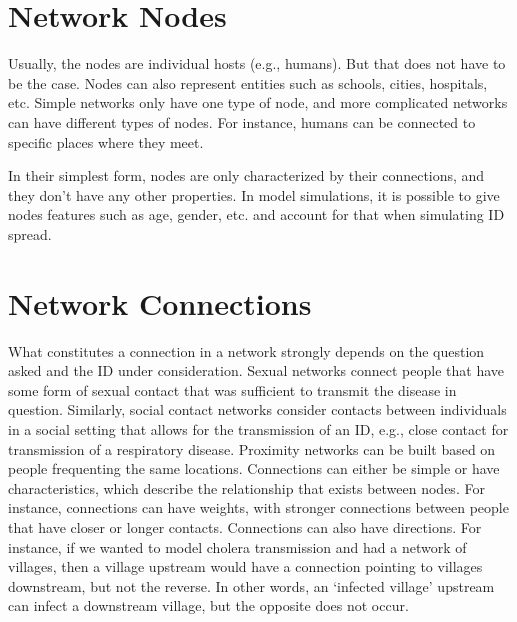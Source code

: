 \documentclass[]{book}
\theoremstyle{definition}
\theoremstyle{definition}
\theoremstyle{definition}
\theoremstyle{remark}
\begin{document}
\section{Network Nodes}\label{network-nodes}

Usually, the nodes are individual hosts (e.g., humans). But that does
not have to be the case. Nodes can also represent entities such as
schools, cities, hospitals, etc. Simple networks only have one type of
node, and more complicated networks can have different types of nodes.
For instance, humans can be connected to specific places where they
meet.

In their simplest form, nodes are only characterized by their
connections, and they don't have any other properties. In model
simulations, it is possible to give nodes features such as age, gender,
etc. and account for that when simulating ID spread.

\section{Network Connections}\label{network-connections}

What constitutes a connection in a network strongly depends on the
question asked and the ID under consideration. Sexual networks connect
people that have some form of sexual contact that was sufficient to
transmit the disease in question. Similarly, social contact networks
consider contacts between individuals in a social setting that allows
for the transmission of an ID, e.g., close contact for transmission of a
respiratory disease. Proximity networks can be built based on people
frequenting the same locations. Connections can either be simple or have
characteristics, which describe the relationship that exists between
nodes. For instance, connections can have weights, with stronger
connections between people that have closer or longer contacts.
Connections can also have directions. For instance, if we wanted to
model cholera transmission and had a network of villages, then a village
upstream would have a connection pointing to villages downstream, but
not the reverse. In other words, an `infected village' upstream can
infect a downstream village, but the opposite does not occur.
\end{document}
